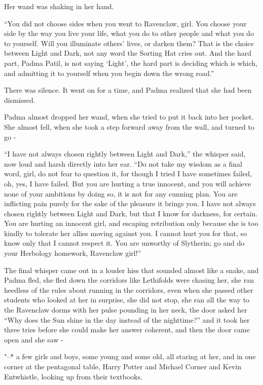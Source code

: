 Her wand was shaking in her hand.

``You did not choose sides when you went to Ravenclaw, girl. You choose
your side by the way you live your life, what you do to other people and
what you do to yourself. Will you illuminate others' lives, or darken
them? That is the choice between Light and Dark, not any word the
Sorting Hat cries out. And the hard part, Padma Patil, is not saying
`Light', the hard part is deciding which is which, and admitting it to
yourself when you begin down the wrong road.''

There was silence. It went on for a time, and Padma realized that she
had been dismissed.

Padma almost dropped her wand, when she tried to put it back into her
pocket. She almost fell, when she took a step forward away from the
wall, and turned to go -

``I have not always chosen rightly between Light and Dark,'' the whisper
said, now loud and harsh directly into her ear. ``Do not take my wisdom
as a final word, girl, do not fear to question it, for though I tried I
have sometimes failed, oh, yes, I have failed. But you are hurting a
true innocent, and you will achieve none of your ambitions by doing so,
it is not for any cunning plan. You are inflicting pain purely for the
sake of the pleasure it brings you. I have not always chosen rightly
between Light and Dark, but that I know for darkness, for certain. You
are hurting an innocent girl, and escaping retribution only because she
is too kindly to tolerate her allies moving against you. I cannot hurt
you for that, so know only that I cannot respect it. You are unworthy of
Slytherin; go and do your Herbology homework, Ravenclaw girl!''

The final whisper came out in a louder hiss that sounded almost like a
snake, and Padma fled, she fled down the corridors like Lethifolds were
chasing her, she ran heedless of the rules about running in the
corridors, even when she passed other students who looked at her in
surprise, she did not stop, she ran all the way to the Ravenclaw dorms
with her pulse pounding in her neck, the door asked her ``Why does the
Sun shine in the day instead of the nighttime?'' and it took her three
tries before she could make her answer coherent, and then the door came
open and she saw -

"--* a few girls and boys, some young and some old, all staring at her, and
in one corner at the pentagonal table, Harry Potter and Michael Corner
and Kevin Entwhistle, looking up from their textbooks.

